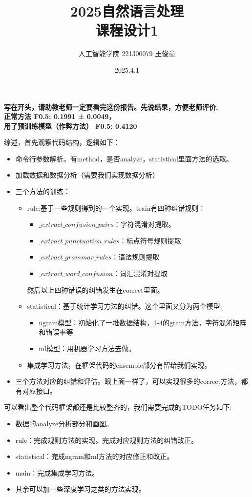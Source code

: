 \documentclass[answers]{exam}  %
\title{2025自然语言处理 \\ 课程设计1}
\date{2025.4.1}
\author{人工智能学院 221300079 王俊童}
\begin{document}
\maketitle
\textbf{写在开头，请助教老师一定要看完这份报告。先说结果，方便老师评价,\\
    正常方法 F0.5: 0.1991 ± 0.0049，\\
    用了预训练模型（作弊方法） F0.5: 0.4120}

综述，首先观察代码结构，逻辑如下：
\begin{itemize}
    \item 命令行参数解析。有method，是否analyze，statistical里面方法的选取。
    \item 加载数据和数据分析（需要我们实现数据分析）
    \item 三个方法的训练：
    \begin{itemize}
        \item rule:基于一些规则得到的一个实现。train有四种纠错规则：
        \begin{itemize}
            \item $\_extract\_confusion\_pairs$：字符混淆对提取。
            \item $\_extract\_punctuation\_rules$：标点符号规则提取
            \item $\_extract\_grammar\_rules$：语法规则提取
            \item $\_extract\_word\_confusion$：词汇混淆对提取
        \end{itemize}
        然后以上四种错误的纠错发生在correct里面。
        \item statistical：基于统计学习方法的纠错。这个里面又分为两个模型:
        \begin{itemize}
            \item ngram模型：初始化了一堆数据结构，1-4的gram方法，字符混淆矩阵和错误率等
            \item ml模型：用机器学习方法去做。
        \end{itemize}
        \item 集成学习方法，在框架代码的ensemble部分有留给我们实现。
    \end{itemize}
    \item 三个方法对应的纠错和评估。跟上面一样了，可以实现很多的correct方法，都有对应接口。
\end{itemize}
可以看出整个代码框架都还是比较整齐的，我们需要完成的TODO任务如下:
\begin{itemize}
    \item 数据的analyze分析部分和画图。
    \item rule：完成规则方法的实现。完成对应规则方法的纠错改正。
    \item statistical：完成ngram和ml方法的对应修正和改正。
    \item main：完成集成学习方法。
    \item 其余可以加一些深度学习之类的方法实现。
\end{itemize}
\end{document}
